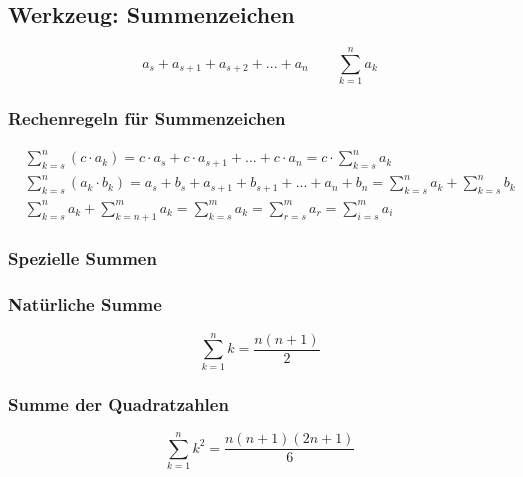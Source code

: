 	\subsection{Werkzeug: Summenzeichen}
	\begin{minipage}{1\linewidth}		
		\begin{equation*}
			a_{s}+a_{s+1}+a_{s+2}+...+a_n \qquad \sum_{k=1}^{n}a_k
		\end{equation*}
	\end{minipage}

	\subsubsection{Rechenregeln für Summenzeichen}
	\begin{align*}
	&\sum_{k=s}^{n}(c \cdot a_k) = c \cdot a_{s} + c \cdot a_{s+1} + ... + c \cdot a_{n} = c \cdot 
	\sum_{k=s}^{n}a_{k}\\
	&\sum_{k=s}^{n}(a_{k} \cdot b_k) = a_s + b_{s} + a_{s+1} + b_{s+1} + ... + a_n + b_{n} = 
	\sum_{k=s}^{n}a_k + \sum_{k=s}^{n}b_{k}\\
	&\sum_{k=s}^{n} a_k + \sum_{k=n+1}^{m} a_k = \sum_{k=s}^{m}a_k = \sum_{r=s}^{m}a_r = \sum_{i=s}^{m}a_i
	\end{align*}
	
	\subsubsection{Spezielle Summen}
	\begin{minipage}{0.45\linewidth}
		\subsubsection{Natürliche Summe}
		\begin{equation*}
			\sum_{k=1}^{n}k = \frac{n(n+1)}{2} 
		\end{equation*}
	\end{minipage}
	\hfill
	\begin{minipage}{0.45\linewidth}
		\subsubsection{Summe der Quadratzahlen}
		\begin{equation*}
			\sum_{k=1}^{n}k^2=\frac{n(n+1)(2n+1)}{6} 
		\end{equation*}
	\end{minipage}

